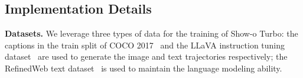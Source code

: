
\subsection{Implementation Details}
\noindent \textbf{Datasets.}
We leverage three types of data for the training of Show-o Turbo: 
the captions in the train split of COCO 2017~\cite{lin2014microsoft} and the LLaVA instruction tuning dataset~\cite{liu2024visual} are used to generate the image and text trajectories respectively; the RefinedWeb text dataset~\cite{penedo2023refinedweb} is used to maintain the language modeling ability. 

